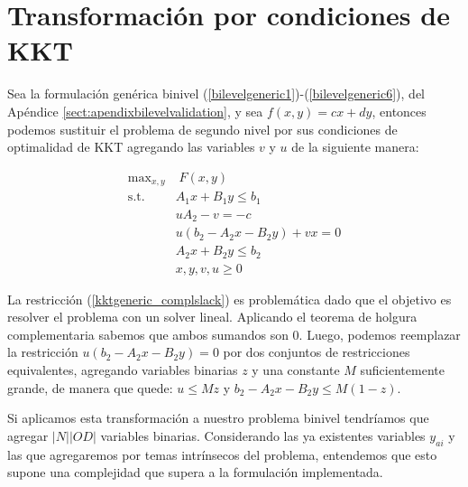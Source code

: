 \chapter{Transformación por condiciones de KKT}
\label{sec:kkttransform}

Sea la formulación genérica binivel (\ref{bilevelgeneric1})-(\ref{bilevelgeneric6}), del Apéndice \ref{sect:apendixbilevelvalidation}, y sea $f(x, y) = cx + dy$, entonces podemos sustituir el problema de segundo nivel por sus condiciones de optimalidad de KKT agregando las variables $v$ y $u$ de la siguiente manera:

\begin{align}
\text{max}_{x,y}        & \; F(x, y) \label{kktgeneric1} \\
\text{s.t.}             & A_1 x + B_1 y \leq b_1 \\
                        & uA_2 - v = -c \\
                        & u(b_2 - A_2x - B_2y) + vx = 0 \label{kktgeneric_complslack} \\
                        & A_2 x + B_2 y \leq b_2 \label{kktgeneric5} \\
                        & x, y, v, u \geq 0 \label{kktgeneric6}
\end{align}

La restricción (\ref{kktgeneric_complslack}) es problemática dado que el objetivo es resolver el problema con un solver lineal. Aplicando el teorema de holgura complementaria sabemos que ambos sumandos son 0. Luego, podemos reemplazar la restricción $u(b_2 - A_2x - B_2y) = 0$ por dos conjuntos de restricciones equivalentes, agregando variables binarias $z$ y una constante $M$ suficientemente grande, de manera que quede: $u \leq Mz$ y $b_2 - A_2x - B_2y \leq M(1-z)$.

Si aplicamos esta transformación a nuestro problema binivel tendríamos que agregar $|N| |OD|$ variables binarias. Considerando las ya existentes variables $y_{ai}$ y las que agregaremos por temas intrínsecos del problema, entendemos que esto supone una complejidad que supera a la formulación implementada.
